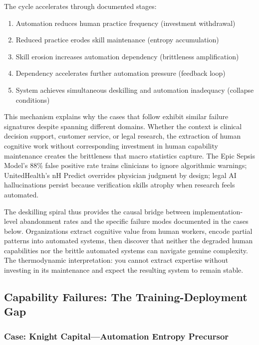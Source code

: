 The cycle accelerates through documented stages:

\begin{enumerate}
\item Automation reduces human practice frequency (investment withdrawal)
\item Reduced practice erodes skill maintenance (entropy accumulation)
\item Skill erosion increases automation dependency (brittleness amplification)
\item Dependency accelerates further automation pressure (feedback loop)
\item System achieves simultaneous deskilling and automation inadequacy (collapse conditions)
\end{enumerate}

This mechanism explains why the cases that follow exhibit similar failure signatures despite spanning different domains. Whether the context is clinical decision support, customer service, or legal research, the extraction of human cognitive work without corresponding investment in human capability maintenance creates the brittleness that macro statistics capture. The Epic Sepsis Model's 88\% false positive rate trains clinicians to ignore algorithmic warnings; UnitedHealth's nH Predict overrides physician judgment by design; legal AI hallucinations persist because verification skills atrophy when research feels automated.

The deskilling spiral thus provides the causal bridge between implementation-level abandonment rates and the specific failure modes documented in the cases below. Organizations extract cognitive value from human workers, encode partial patterns into automated systems, then discover that neither the degraded human capabilities nor the brittle automated systems can navigate genuine complexity. The thermodynamic interpretation: you cannot extract expertise without investing in its maintenance and expect the resulting system to remain stable.

\subsection{Capability Failures: The Training-Deployment Gap}

\subsubsection{Case: Knight Capital---Automation Entropy Precursor}

